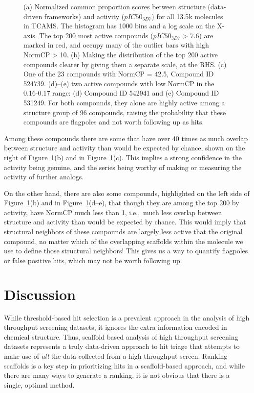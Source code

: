 \documentclass[journal=jacsat,manuscript=article]{achemso}
\newcommand*\fref[1]{Figure~\ref{fig:#1}}
\newcommand*\ie{i.e.,~}
\begin{document}
\begin{figure}
  \caption{(a) Normalized common proportion scores between structure (data-driven frameworks) and activity ($pIC50_{3D7}$) for all 13.5k molecules in TCAMS.  The histogram has 1000 bins and a log scale on the X-axis. The top 200 most active compounds ($pIC50_{3D7}$ > 7.6) are marked in red, and occupy many of the outlier bars with high NormCP > 10. (b) Making the distribution of the top 200 active compounds clearer by giving them a separate scale, at the RHS. (c) One of the 23 compounds with NormCP = 42.5, Compound ID 524739. (d)--(e) two active compounds with low NormCP in the 0.16-0.17 range: (d) Compound ID 542941 and (e) Compound ID 531249. For both compounds, they alone are highly active among a structure group of 96 compounds, raising the probability that these compounds are flagpoles and not worth following up as hits.}
\label{fig:NormCP}   
\end{figure}

Among these compounds there are some that have over 40 times as much overlap between structure and activity than would be expected by chance, shown on the right of \fref{NormCP}(b) and in \fref{NormCP}(c).  This implies a strong confidence in the activity being genuine, and the series being worthy of making or measuring the activity of further analogs.

On the other hand, there are also some compounds, highlighted on the left side of \fref{NormCP}(b) and in \fref{NormCP}(d--e), that though they are among the top 200 by activity, have NormCP much less than 1, \ie much less overlap between structure and activity than would be expected by chance.  This would imply that structural neighbors of these compounds are largely less active that the original compound, no matter which of the overlapping scaffolds within the molecule we use to define those structural neighbors!  This gives us a way to quantify flagpoles or false positive hits, which may not be worth following up.

\section{Discussion}
\label{sec:discussion}

While threshold-based hit selection is a prevalent approach in the
analysis of high throughput screening datasets, it
ignores the extra information encoded in chemical structure. Thus,
scaffold based analysis of high throughput screening datasets
represents a truly data-driven approach to hit triage that attempts to
make use of \emph{all} the data collected from a high throughput
screen. Ranking scaffolds is a key step in prioritizing hits in a
scaffold-based approach, and while there are many ways to generate a
ranking, it is not obvious that there is a single, optimal method.
\end{document}
